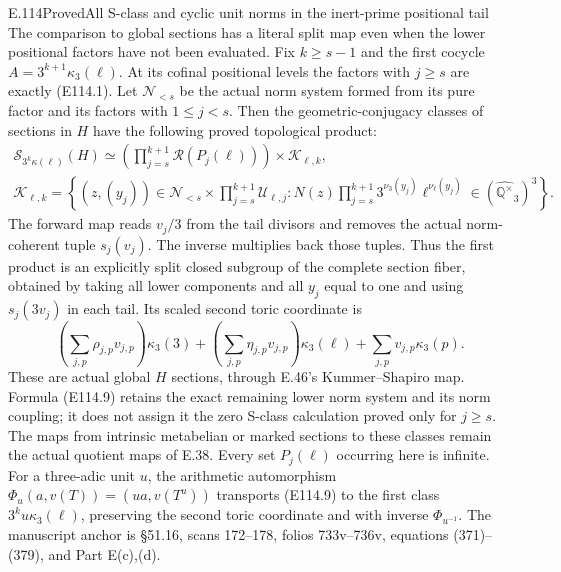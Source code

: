 \begin{statement}{E.114}{Proved}{All S-class and cyclic unit norms in the inert-prime positional tail}
The comparison to global sections has a literal split
map even when the lower positional factors have not
been evaluated. Fix $k\ge s-1$ and the first cocycle
$A=3^{k+1}\kappa_3(\ell)$.
At its cofinal positional levels the factors with
$j\ge s$ are exactly (E114.1). Let $\mathcal N_{<s}$
be the actual norm system formed from its pure factor
and its factors with $1\le j<s$.
Then the geometric-conjugacy classes of sections in
$H$ have the following proved topological product:
\[
 \begin{gathered}
 \mathscr S_{3^k\kappa(\ell)}(H)
   \simeq
   \left(\prod_{j=s}^{k+1}\mathcal R(P_j(\ell))\right)
                                      \times\mathcal K_{\ell,k},\\
 \mathcal K_{\ell,k}=
 \left\{(z,(y_j))\in\mathcal N_{<s}\times
                \prod_{j=s}^{k+1}\mathcal U_{\ell,j}:
     N(z)\prod_{j=s}^{k+1}3^{\nu_3(y_j)}\ell^{\nu_\ell(y_j)}
                     \in(\widehat{\mathbb Q^\times}_3)^3\right\}.
 \end{gathered}
 \tag{E114.9}
\]
The forward map reads $v_j/3$ from the tail divisors
and removes the actual norm-coherent tuple
$s_j(v_j)$. The inverse multiplies back those tuples.
Thus the first product is an explicitly split closed
subgroup of the complete section fiber, obtained by
taking all lower components and all $y_j$ equal to one
and using $s_j(3v_j)$ in each tail.
Its scaled second toric coordinate is
\[
   \left(\sum_{j,p}\rho_{j,p}v_{j,p}\right)\kappa_3(3)
  +\left(\sum_{j,p}\eta_{j,p}v_{j,p}\right)\kappa_3(\ell)
  +\sum_{j,p}v_{j,p}\kappa_3(p).
 \tag{E114.10}
\]
These are actual global $H$ sections, through E.46's
Kummer--Shapiro map. Formula (E114.9) retains the exact
remaining lower norm system and its norm coupling;
it does not assign it the zero S-class calculation
proved only for $j\ge s$. The maps from intrinsic
metabelian or marked sections to these classes remain
the actual quotient maps of E.38.
Every set $P_j(\ell)$ occurring here is infinite.
For a three-adic unit $u$, the arithmetic automorphism
$\Phi_u(a,v(T))=(ua,v(T^u))$ transports (E114.9)
to the first class $3^ku\kappa_3(\ell)$, preserving
the second toric coordinate and with inverse $\Phi_{u^{-1}}$.
The manuscript anchor is \S51.16, scans 172--178,
folios 733v--736v, equations (371)--(379), and Part E(c),(d).
\end{statement}

